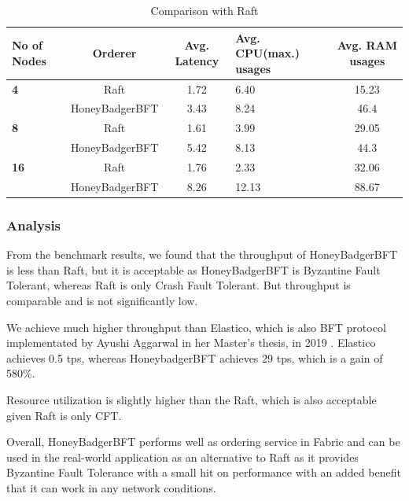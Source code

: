    \clearpage
   
 \begin{table}[!h]
 \centering
\begin{tabular}{ |C{1cm}|c|c|C{3cm}|c|}
\hline
 \textbf{No of Nodes} & \textbf{Orderer} & \textbf{Avg. Latency} & \textbf{Avg. CPU(max.) usages} & \textbf{Avg. RAM usages}  \\
 \hline
  \textbf{4} & Raft&1.72&    6.40&    15.23\\
  
  & HoneyBadgerBFT &3.43&    8.24&    46.4\\
  \hline
  \textbf{8} & Raft & 1.61&    3.99    &29.05\\
  
  & HoneyBadgerBFT &5.42&    8.13&    44.3\\
  \hline
  \textbf{16} & Raft&1.76&    2.33&    32.06\\
  
  & HoneyBadgerBFT &8.26    &12.13&    88.67\\
  
  \hline
  
\end{tabular}
\caption{Comparison with Raft}

\end{table}

\subsubsection{Analysis}
From the benchmark results, we found that the throughput of HoneyBadgerBFT is less than Raft, but it is acceptable as HoneyBadgerBFT is Byzantine Fault Tolerant, whereas Raft is only Crash Fault Tolerant. But throughput is comparable and is not significantly low.

We achieve much higher throughput than Elastico, which is also BFT protocol implementated by Ayushi Aggarwal in her Master's thesis, in 2019 \cite{elastico}. Elastico achieves 0.5 tps, whereas HoneybadgerBFT achieves 29 tps, which is a gain of 580\%.

Resource utilization is slightly higher than the Raft, which is also acceptable given Raft is only CFT.


Overall, HoneyBadgerBFT performs well as ordering service in Fabric and can be used in the real-world application as an alternative to Raft as it provides Byzantine Fault Tolerance with a small hit on performance with an added benefit that it can work in any network conditions.
